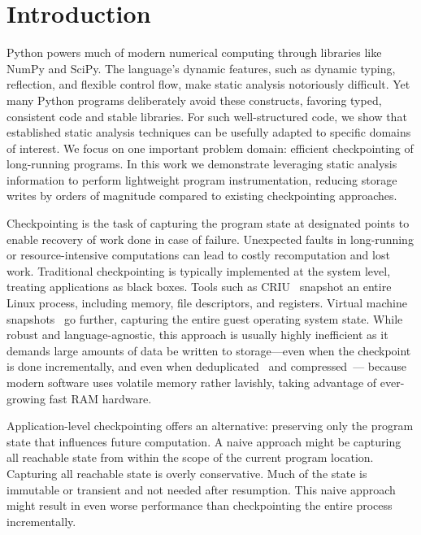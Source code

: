 \section{Introduction}
Python powers much of modern numerical computing through libraries like NumPy and SciPy. The language's dynamic features, such as dynamic typing, reflection, and flexible control flow, make static analysis notoriously difficult. Yet many Python programs deliberately avoid these constructs, favoring typed, consistent code and stable libraries. For such well-structured code, we show that established static analysis techniques can be usefully adapted to specific domains of interest. We focus on one important problem domain: efficient checkpointing of long-running programs. 
In this work we demonstrate leveraging static analysis information to perform lightweight program instrumentation, reducing storage writes by orders of magnitude compared to existing checkpointing approaches.

Checkpointing is the task of capturing the program state at designated points to enable recovery of work done in case of failure. Unexpected faults in long-running or resource-intensive computations can lead to costly recomputation and lost work. Traditional checkpointing is typically implemented at the system level, treating applications as black boxes. Tools such as CRIU~\cite{corbet2011checkpoint} snapshot an entire Linux process, including memory, file descriptors, and registers. Virtual machine snapshots~\cite{VMwareSnapshot, RedHatVMSnapshot} go further, capturing the entire guest operating system state. While robust and language-agnostic, this approach is usually highly inefficient as it demands large amounts of data be written to storage---even when the checkpoint is done incrementally, and even when deduplicated~\cite{meyer2012study} and compressed~\cite{ferreira2013checkpoint}---
because modern software uses volatile memory rather lavishly, 
taking advantage of ever-growing fast RAM hardware.

Application-level checkpointing offers an alternative: preserving only the program state that influences future computation. A naive approach might be capturing all reachable state from within the scope of the current program location. Capturing all reachable state is overly conservative. Much of the state is immutable or transient and not needed after resumption.  This naive approach might result in even worse performance than checkpointing the entire process incrementally.

